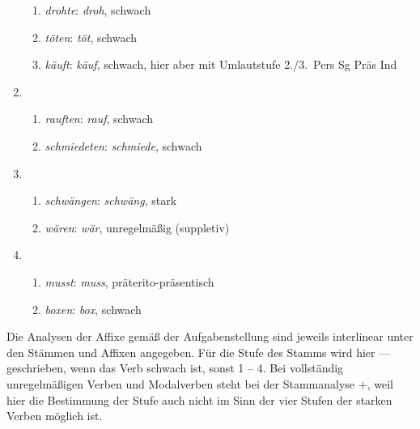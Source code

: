 \begin{enumerate}
\begin{enumerate}
      \item \textit{drohte}: \textit{droh}, schwach
      \item \textit{töten}: \textit{töt}, schwach
      \item \textit{käuft}: \textit{käuf}, schwach, hier aber mit Umlautstufe 2.\slash 3.~Pers Sg Präs Ind
    \end{enumerate}
  \item
    \begin{enumerate}\Lf
      \item \textit{rauften}: \textit{rauf}, schwach
      \item \textit{schmiedeten}: \textit{schmiede}, schwach
    \end{enumerate}
  \item
    \begin{enumerate}\Lf
      \item \textit{schwängen}: \textit{schwäng}, stark
      \item \textit{wären}: \textit{wär}, unregelmäßig (suppletiv)
    \end{enumerate}
  \item
    \begin{enumerate}\Lf
      \item \textit{musst}: \textit{muss}, präterito-präsentisch
      \item \textit{boxen}: \textit{box}, schwach
    \end{enumerate}
\end{enumerate}


Die Analysen der Affixe gemäß der Aufgabenstellung sind jeweils interlinear unter den Stämmen und Affixen angegeben.
Für die Stufe des Stamms wird hier --- geschrieben, wenn das Verb schwach ist, sonst 1 -- 4.
Bei vollständig unregelmäßigen Verben und Modalverben steht bei der Stammanalyse $+$, weil hier die Bestimmung der Stufe auch nicht im Sinn der vier Stufen der starken Verben möglich ist.

\setcounter{equation}{0}

